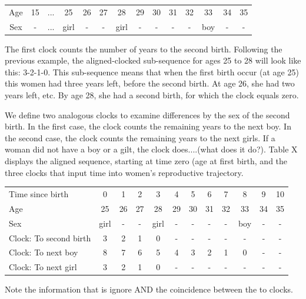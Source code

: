 \documentclass{article}
\begin{document}
\begin{center}
\begin{tabular}{c|ccccccccccccc}
\hline
    Age & 15 & $...$ & 25 & 26 & 27 & 28 & 29 & 30 & 31 & 32 & 33 & 34 & 35 \\
    Sex & - & $...$ & girl & - & - & girl & - & - & - & - & boy & - & - \\\hline
\end{tabular}
\end{center}

The first clock counts the number of years to the second birth. Following the previous example, the aligned-clocked sub-sequence for ages 25 to 28 will look like this: 3-2-1-0. This sub-sequence means that when the first birth occur (at age 25) this women had three years left, before the second birth. At age 26, she had two years left, etc. By age 28, she had a second birth, for which the clock equals zero.

We define two analogous clocks to examine differences by the sex of the second birth. In the first case, the clock counts the remaining years to the next boy. In the second case, the clock counts the remaining years to the next girls. If a woman did not have a boy or a gilt, the clock does....(what does it do?). Table X displays the aligned sequence, starting at time zero (age at first birth, and the three clocks that input time into women's reproductive trajectory.

\begin{center}
\begin{tabular}{l|ccccccccccc}
\hline
    Time since birth & 0 & 1 & 2 & 3 & 4 & 5 & 6 & 7 & 8 & 9 & 10 \\
    Age & 25 & 26 & 27 & 28 & 29 & 30 & 31 & 32 & 33 & 34 & 35 \\
    Sex & girl & - & - & girl & - & - & - & - & boy & - & - \\
    Clock: To second birth & 3 & 2 & 1 & 0 & - & - & - & - & - & - & - \\
    Clock: To next boy & 8 & 7 & 6 & 5 & 4 & 3 & 2 & 1 & 0 & - & - \\
    Clock: To next girl & 3 & 2 & 1 & 0 & - & - & - & - & - & - & - \\\hline
\end{tabular}
\end{center}

Note the information that is ignore AND the coincidence between the to clocks.
\end{document}
